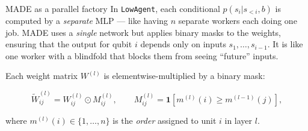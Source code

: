 \documentclass[11pt, a4paper]{article}
\begin{document}
\begin{analogybox}{MADE as a parallel factory}
In \texttt{LowAgent}, each conditional $p(s_i | s_{<i}, b)$ is computed by a
\emph{separate} MLP — like having $n$ separate workers each doing one job.
MADE uses a \emph{single} network but applies binary masks to the weights,
ensuring that the output for qubit $i$ depends only on inputs $s_1, \ldots,
s_{i-1}$. It is like one worker with a blindfold that blocks them from seeing
``future'' inputs.
\end{analogybox}

Each weight matrix $W^{(l)}$ is elementwise-multiplied by a binary mask:

\begin{equation}
  \tilde{W}^{(l)}_{ij} = W^{(l)}_{ij} \odot M^{(l)}_{ij},
  \qquad
  M^{(l)}_{ij} = \mathbf{1}\!\left[m^{(l)}(i) \geq m^{(l-1)}(j)\right],
\end{equation}

where $m^{(l)}(i) \in \{1, \ldots, n\}$ is the \emph{order} assigned to
unit $i$ in layer $l$.
\end{document}
